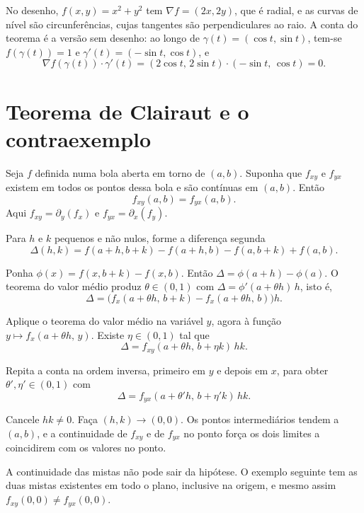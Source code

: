 \documentclass[11pt,a4paper]{article}
\begin{document}

No desenho, $f(x,y)=x^2+y^2$ tem $\nabla f=(2x,2y)$, que é radial, e as curvas de nível são circunferências, cujas tangentes são perpendiculares ao raio. A conta do teorema é a versão sem desenho: ao longo de $\gamma(t)=(\cos t,\sin t)$, tem-se $f(\gamma(t))=1$ e $\gamma'(t)=(-\sin t,\cos t)$, e
\[
\nabla f(\gamma(t))\cdot\gamma'(t)=(2\cos t,\,2\sin t)\cdot(-\sin t,\,\cos t)=0.
\]

\section{Teorema de Clairaut e o contraexemplo}

\begin{teorema}
Seja $f$ definida numa bola aberta em torno de $(a,b)$. Suponha que $f_{xy}$ e $f_{yx}$ existem em todos os pontos dessa bola e são contínuas em $(a,b)$. Então
\[
f_{xy}(a,b)=f_{yx}(a,b).
\]
Aqui $f_{xy}=\partial_y(f_x)$ e $f_{yx}=\partial_x(f_y)$.
\end{teorema}

\begin{esqueleto}
\item Para $h$ e $k$ pequenos e não nulos, forme a diferença segunda
\[
\Delta(h,k)=f(a+h,b+k)-f(a+h,b)-f(a,b+k)+f(a,b).
\]
\item Ponha $\phi(x)=f(x,b+k)-f(x,b)$. Então $\Delta=\phi(a+h)-\phi(a)$. O teorema do valor médio produz $\theta\in(0,1)$ com $\Delta=\phi'(a+\theta h)\,h$, isto é,
\[
\Delta=\bigl(f_x(a+\theta h,\,b+k)-f_x(a+\theta h,\,b)\bigr)h.
\]
\item Aplique o teorema do valor médio na variável $y$, agora à função $y\mapsto f_x(a+\theta h,\,y)$. Existe $\eta\in(0,1)$ tal que
\[
\Delta=f_{xy}(a+\theta h,\,b+\eta k)\,hk.
\]
\item Repita a conta na ordem inversa, primeiro em $y$ e depois em $x$, para obter $\theta',\eta'\in(0,1)$ com
\[
\Delta=f_{yx}(a+\theta' h,\,b+\eta' k)\,hk.
\]
\item Cancele $hk\neq 0$. Faça $(h,k)\to(0,0)$. Os pontos intermediários tendem a $(a,b)$, e a continuidade de $f_{xy}$ e de $f_{yx}$ no ponto força os dois limites a coincidirem com os valores no ponto.
\end{esqueleto}

A continuidade das mistas não pode sair da hipótese. O exemplo seguinte tem as duas mistas existentes em todo o plano, inclusive na origem, e mesmo assim $f_{xy}(0,0)\neq f_{yx}(0,0)$.
\end{document}
